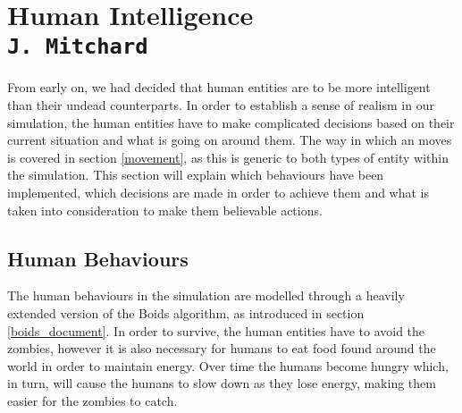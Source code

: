 \pagestyle{empty}



\section{Human Intelligence\\{\small\tt J.~Mitchard}}
\label{human_doc}
From early on, we had decided that human entities are to be more intelligent than their undead counterparts. In order to establish a sense of realism in our simulation, the human entities have to make complicated decisions based on their current situation and what is going on around them. The way in which an moves is covered in section \ref{movement}, as this is generic to both types of entity within the simulation. This section will explain which behaviours have been implemented, which decisions are made in order to achieve them and what is taken into consideration to make them believable actions.

\subsection{Human Behaviours}
The human behaviours in the simulation are modelled through a heavily extended version of the Boids algorithm, as introduced in section \ref{boids_document}. In order to survive, the human entities have to avoid the zombies, however it is also necessary for humans to eat food found around the world in order to maintain energy. Over time the humans become hungry which, in turn, will cause the humans to slow down as they lose energy, making them easier for the zombies to catch.

